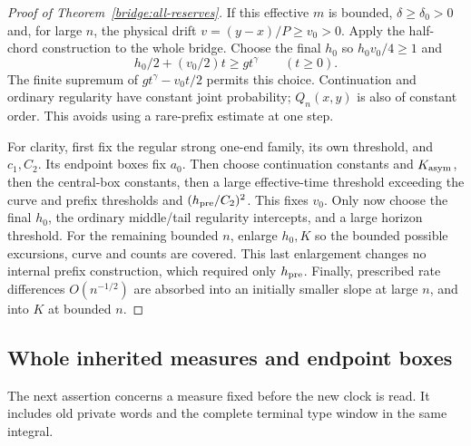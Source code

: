 \begin{proof}[Proof of Theorem~\ref{bridge:all-reserves}]
If this effective $m$ is bounded, $\delta\ge\delta_0>0$ and, for
large $n$, the physical drift $v=(y-x)/P\ge v_0>0$. Apply the
half-chord construction to the whole bridge. Choose the final $h_0$
so $h_0v_0/4\ge1$ and
\[
 h_0/2+(v_0/2)t\ge gt^\gamma\qquad(t\ge0).
\]
The finite supremum of $gt^\gamma-v_0t/2$ permits this choice.
Continuation and ordinary regularity have constant joint probability;
$Q_n(x,y)$ is also of constant order. This avoids using a rare-prefix
estimate at one step.

For clarity, first fix the regular strong one-end family, its own
threshold, and $c_1,C_2$. Its endpoint boxes fix $a_0$. Then choose
continuation constants and $K_{\rm asym}$, then the central-box
constants, then a large effective-time threshold exceeding the curve
and prefix thresholds and $(h_{\rm pre}/C_2)^2$. This fixes $v_0$.
Only now choose the final $h_0$, the ordinary middle/tail regularity
intercepts, and a large horizon threshold. For the remaining bounded
$n$, enlarge $h_0,K$ so the bounded possible excursions, curve and
counts are covered. This last enlargement changes no internal prefix
construction, which required only $h_{\rm pre}$. Finally, prescribed
rate differences $O(n^{-1/2})$ are absorbed into an initially smaller
slope at large $n$, and into $K$ at bounded $n$.
\end{proof}

\subsection{Whole inherited measures and endpoint boxes}

The next assertion concerns a measure fixed before the new clock is
read. It includes old private words and the complete terminal type
window in the same integral.

